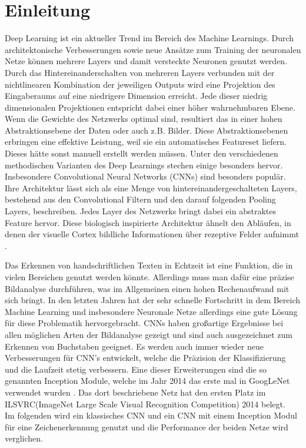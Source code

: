 \documentclass[runningheads,a4paper]{llncs}[2015/06/24]
\begin{document}
\section{Einleitung}\label{sec:intro}
Deep Learning ist ein aktueller Trend im Bereich des Machine Learnings. Durch architektonische Verbesserungen sowie neue Ansätze zum Training der neuronalen Netze können mehrere Layers und damit versteckte Neuronen genutzt werden. Durch das Hintereinanderschalten von mehreren Layers verbunden mit der nichtlinearen Kombination der jeweiligen Outputs wird eine Projektion des Eingaberaums auf eine niedrigere Dimension erreicht. Jede dieser niedrig dimensionalen Projektionen entspricht dabei einer höher wahrnehmbaren Ebene. Wenn die Gewichte des Netzwerks optimal sind, resultiert das in einer hohen Abstraktionsebene der Daten oder auch z.B. Bilder. Diese Abstraktionsebenen erbringen eine effektive Leistung, weil sie ein automatisches Featureset liefern. Dieses hätte sonst manuell erstellt werden müssen. Unter den verschiedenen methodischen Varianten des Deep Learnings stechen einige besonders hervor. Insbesondere Convolutional Neural Networks (CNNs) sind besonders populär. Ihre Architektur lässt sich als eine Menge von hintereinandergeschalteten Layers, bestehend aus den Convolutional Filtern und den darauf folgenden Pooling Layers, beschreiben. Jedes Layer des Netzwerks bringt dabei ein abstraktes Feature hervor. Diese biologisch inspirierte Architektur ähnelt den Abläufen, in denen der visuelle Cortex bildliche Informationen über rezeptive Felder aufnimmt \cite{ravi}.

Das Erkennen von handschriftlichen Texten in Echtzeit ist eine Funktion, die in vielen Bereichen genutzt werden könnte. Allerdings muss man dafür eine präzise Bildanalyse durchführen, was im Allgemeinen einen hohen Rechenaufwand mit sich bringt. In den letzten Jahren hat der sehr schnelle Fortschritt in dem Bereich Machine Learning und insbesondere Neuronale Netze allerdings eine gute Lösung für diese Problematik hervorgebracht. CNNs haben großartige Ergebnisse bei allen möglichen Arten der Bildanalyse gezeigt und sind auch ausgezeichnet zum Erkennen von Buchstaben geeignet. Es werden auch immer wieder neue Verbesserungen für CNN's entwickelt, welche die Präzision der Klassifizierung und die Laufzeit stetig verbessern. Eine dieser Erweiterungen sind die so genannten Inception Module, welche im Jahr 2014 das erste mal in GoogLeNet verwendet wurden \cite{inception_paper}. Das dort beschriebene Netz hat den ersten Platz im ILSVRC(ImageNet Large Scale Visual Recognition Competition) 2014 belegt.\\
Im folgenden wird ein klassisches CNN und ein CNN mit einem Inception Modul für eine Zeichenerkennung genutzt und die Performance der beiden Netze wird verglichen.\\
\end{document}
